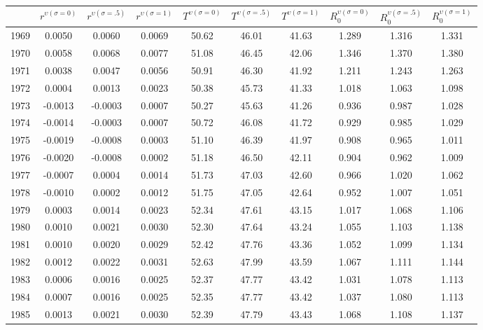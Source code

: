 \begin{tabular}{cccccccccc}
  \hline
 & $r^{\upsilon (\sigma = 0)}$ & $r^{\upsilon (\sigma = .5)}$ & $r^{\upsilon (\sigma = 1)}$ & $T^{\upsilon (\sigma = 0)}$ & $T^{\upsilon (\sigma = .5)}$ & $T^{\upsilon (\sigma = 1)}$ & $R_0^{\upsilon (\sigma = 0)}$ & $R_0^{\upsilon (\sigma = .5)}$ & $R_0^{\upsilon (\sigma = 1)}$ \\ 
  \hline
1969 & 0.0050 & 0.0060 & 0.0069 & 50.62 & 46.01 & 41.63 & 1.289 & 1.316 & 1.331 \\ 
  1970 & 0.0058 & 0.0068 & 0.0077 & 51.08 & 46.45 & 42.06 & 1.346 & 1.370 & 1.380 \\ 
  1971 & 0.0038 & 0.0047 & 0.0056 & 50.91 & 46.30 & 41.92 & 1.211 & 1.243 & 1.263 \\ 
  1972 & 0.0004 & 0.0013 & 0.0023 & 50.38 & 45.73 & 41.33 & 1.018 & 1.063 & 1.098 \\ 
  1973 & -0.0013 & -0.0003 & 0.0007 & 50.27 & 45.63 & 41.26 & 0.936 & 0.987 & 1.028 \\ 
  1974 & -0.0014 & -0.0003 & 0.0007 & 50.72 & 46.08 & 41.72 & 0.929 & 0.985 & 1.029 \\ 
  1975 & -0.0019 & -0.0008 & 0.0003 & 51.10 & 46.39 & 41.97 & 0.908 & 0.965 & 1.011 \\ 
  1976 & -0.0020 & -0.0008 & 0.0002 & 51.18 & 46.50 & 42.11 & 0.904 & 0.962 & 1.009 \\ 
  1977 & -0.0007 & 0.0004 & 0.0014 & 51.73 & 47.03 & 42.60 & 0.966 & 1.020 & 1.062 \\ 
  1978 & -0.0010 & 0.0002 & 0.0012 & 51.75 & 47.05 & 42.64 & 0.952 & 1.007 & 1.051 \\ 
  1979 & 0.0003 & 0.0014 & 0.0023 & 52.34 & 47.61 & 43.15 & 1.017 & 1.068 & 1.106 \\ 
  1980 & 0.0010 & 0.0021 & 0.0030 & 52.30 & 47.64 & 43.24 & 1.055 & 1.103 & 1.138 \\ 
  1981 & 0.0010 & 0.0020 & 0.0029 & 52.42 & 47.76 & 43.36 & 1.052 & 1.099 & 1.134 \\ 
  1982 & 0.0012 & 0.0022 & 0.0031 & 52.63 & 47.99 & 43.59 & 1.067 & 1.111 & 1.144 \\ 
  1983 & 0.0006 & 0.0016 & 0.0025 & 52.37 & 47.77 & 43.42 & 1.031 & 1.078 & 1.113 \\ 
  1984 & 0.0007 & 0.0016 & 0.0025 & 52.35 & 47.77 & 43.42 & 1.037 & 1.080 & 1.113 \\ 
  1985 & 0.0013 & 0.0021 & 0.0030 & 52.39 & 47.79 & 43.43 & 1.068 & 1.108 & 1.137 \\ 

\end{tabular}
